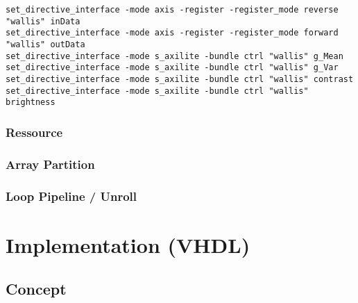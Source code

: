 \begin{minipage}{\textwidth}
\begin{lstlisting}[style=TextStyle, label=lst:interface]
set_directive_interface -mode axis -register -register_mode reverse "wallis" inData
set_directive_interface -mode axis -register -register_mode forward "wallis" outData
set_directive_interface -mode s_axilite -bundle ctrl "wallis" g_Mean
set_directive_interface -mode s_axilite -bundle ctrl "wallis" g_Var
set_directive_interface -mode s_axilite -bundle ctrl "wallis" contrast
set_directive_interface -mode s_axilite -bundle ctrl "wallis" brightness

\end{lstlisting}
\end{minipage}



\subsubsection*{Ressource}
\subsubsection*{Array Partition}
\subsubsection*{Loop Pipeline / Unroll}

\section{Implementation (VHDL)} \label{ch:ip:imp_vhdl}

\subsection{Concept}